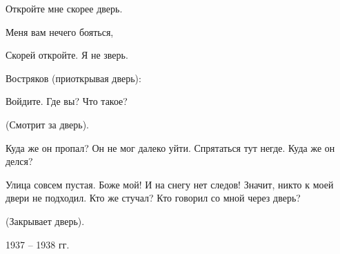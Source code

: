 Откройте мне скорее дверь.
 
Меня вам нечего бояться,
 
Скорей откройте. Я не зверь.
 
\leavevmode\hspace{-1cm}
\fontsize{14}{16}\selectfont Востряков \normalsize (приоткрывая дверь):
 
Войдите. Где вы? Что такое?

\begin{center} 
(Смотрит за дверь).
\end{center}

Куда же он пропал? Он не мог далеко уйти. Спрятаться тут негде. Куда же он делся? 

Улица совсем пустая. Боже мой! И на снегу нет следов! Значит, никто к моей двери не подходил. Кто же стучал? Кто говорил со мной через дверь?

\begin{center}
(Закрывает дверь).
\end{center}

\begin{flushright}
1937 -- 1938 гг.
\end{flushright}